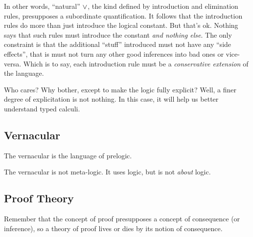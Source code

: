 \documentclass{article}
\begin{document}
In other words, ``natural'' \(\lor\), the kind defined by
introduction and elimination rules, presupposes a subordinate
quantification. It follows that the introduction rules do more than
just introduce the logical constant. But that's ok. Nothing says that
such rules must introduce the constant \textit{and nothing else}. The
only constraint is that the additional ``stuff'' introduced must not
have any ``side effects'', that is must not turn any other good
inferences into bad ones or vice-versa. Which is to say, each
introduction rule must be a \textit{conservative extension} of the
language.

Who cares? Why bother, except to make the logic fully explicit? Well,
a finer degree of explicitation is not nothing. In this case, it will
help us better understand typed calculi.

\subsection{Vernacular}

The vernacular is the language of prelogic.

The vernacular is not meta-logic. It uses logic, but is not
\textit{about} logic.

\subsection{Proof Theory}


Remember that the concept of proof presupposes a concept of
consequence (or inference), so a theory of proof lives or dies by its
notion of consequence.
\end{document}

